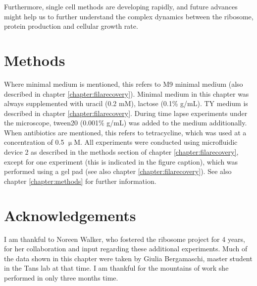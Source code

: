 
Furthermore, single cell methods are developing rapidly, and future advances might help us to further understand the complex dynamics between the ribosome, protein production and cellular growth rate.




\section{Methods}

Where minimal medium is mentioned, this refers to M9 minimal medium (also described in chapter \ref{chapter:filarecovery}).
%
Minimal medium in this chapter was always supplemented with uracil (0.2 mM), lactose (0.1\% g/mL).
TY medium is described in chapter \ref{chapter:filarecovery}.
%
During time lapse experiments under the microscope, tween20 (0.001\% g/mL) was added to the medium additionally.
%
When antibiotics are mentioned, this refers to tetracycline, which was used at a concentration of 0.5 $\upmu$M.
%
All experiments were conducted using microfluidic device 2 as described in the methods section of chapter \ref{chapter:filarecovery},
except for one experiment (this is indicated in the figure caption), which was performed using a gel pad (see also chapter \ref{chapter:filarecovery}).
%
See also chapter \ref{chapter:methods} for further information.

\section{Acknowledgements}

%
I am thankful to Noreen Walker, who fostered the ribosome project for 4 years, for her collaboration and input regarding these additional experiments.
%
Much of the data shown in this chapter were taken by Giulia Bergamaschi, master student in the Tans lab at that time. I am thankful for 
the mountains of work she performed in only three months time.


